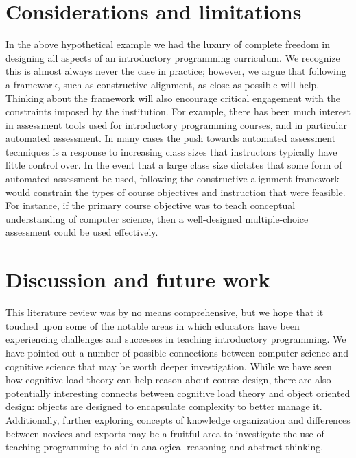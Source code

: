 \documentclass[12pt]{article}
\begin{document}
\section{Considerations and limitations}
In the above hypothetical example we had the luxury of complete
freedom in designing all aspects of an introductory programming
curriculum. We recognize this is almost always never the case in
practice; however, we argue that following a framework, such as
constructive alignment, as close as possible will help. Thinking about
the framework will also encourage critical engagement with the
constraints imposed by the institution. For example, there has been
much interest in assessment tools used for introductory programming
courses\autocite{lister_blooming_2000,lister_objectives_2001,sheard_exploring_2011},
and in particular automated
assessment\autocite{cheang_automated_2003,traynor_synthesis_2005,ihantola_review_2010}. In
many cases the push towards automated assessment techniques is a
response to increasing class sizes that instructors typically have
little control over. In the event that a large class size dictates
that some form of automated assessment be used, following the
constructive alignment framework would constrain the types of course
objectives and instruction that were feasible. For instance, if the
primary course objective was to teach conceptual understanding of
computer science, then a well-designed multiple-choice assessment
could be used
effectively\autocite{lister_blooming_2000,lister_objectives_2001}.

\section{Discussion and future work}

This literature review was by no means comprehensive, but we hope that
it touched upon some of the notable areas in which educators have been
experiencing challenges and successes in teaching introductory
programming. We have pointed out a number of possible connections
between computer science and cognitive science that may be worth
deeper investigation. While we have seen how cognitive load theory can
help reason about course design, there are also potentially
interesting connects between cognitive load theory and object oriented
design: objects are designed to encapsulate complexity to better
manage it. Additionally, further exploring concepts of knowledge
organization and differences between novices and exports may be a
fruitful area to investigate the use of teaching programming to aid in
analogical reasoning and abstract
thinking\autocite{bennedssen_abstraction_2008}.
\end{document}
